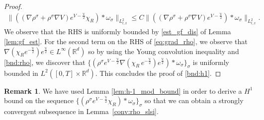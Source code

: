 \documentclass[reqno, 11pt]{amsart}
\numberwithin{equation}{section}
\theoremstyle{definition}
\newtheorem{rem}[thm]{Remark}
\begin{document}
\begin{proof}
    \begin{align*}
        \|((\nabla \rho^\sigma +\rho^\sigma\nabla V)e^{V-\frac{\mathbb{V}}{2}}\chi_R)\ast \omega_\sigma\|_{L_{t,x}^2}
        \leq C \|((\nabla \rho^\sigma +\rho^\sigma\nabla V)e^{V-\frac{\mathbb{V}}{2}})\ast \omega_\sigma\|_{L_{t,x}^2}.
    \end{align*}
    We observe that the RHS is uniformly bounded by \ref{est_gf_dis} of Lemma \ref{lem:gf_est}. For the second term on the RHS of \eqref{eq:grad_rho}, we observe that $\nabla(\chi_R e^{-\frac{\mathbb{V}}{2}})e^{\frac{\mathbb{V}}{2}}\in L^\infty(\mathbb{R}^{d})$ so by using the Young convolution inequality and \ref{bnd:rho}, we discover that $\{(\rho^\sigma e^{V-\frac{\mathbb{V}}{2}}\nabla(\chi_R\, e^{-\frac{\mathbb{V}}{2}})e^{\frac{\mathbb{V}}{2}})\ast\omega_\sigma\}_\sigma$ is uniformly bounded in $L^2([0,T]\times\mathbb{R}^{d})$. This concludes the proof of \ref{bnd:h1}.
\end{proof}

\begin{rem}
    We have used Lemma \ref{lem:h-1_mod_bound} in order to derive a $H^1$ bound on the sequence $\{(\rho^{\sigma} e^{V-\frac{\mathbb{V}}{2}}\chi_R)\ast\omega_\sigma\}_\sigma$ so that we can obtain a strongly convergent subsequence in Lemma~\ref{conv:rho_slsi}.
\end{rem}
\end{document}

